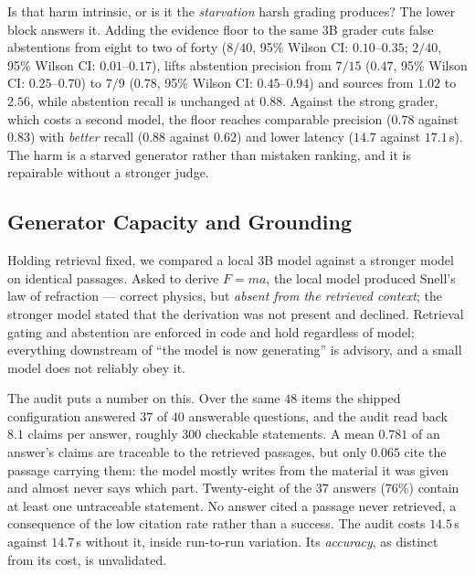 \documentclass[conference]{IEEEtran}
\begin{document}
Is that harm intrinsic, or is it the \emph{starvation} harsh grading produces?
The lower block answers it. Adding the evidence floor to the same $3$B grader
cuts false abstentions from eight to two of forty ($8/40$, 95\% Wilson CI:
$0.10$--$0.35$; $2/40$, 95\% Wilson CI: $0.01$--$0.17$), lifts abstention
precision from $7/15$ ($0.47$, 95\% Wilson CI: $0.25$--$0.70$) to $7/9$ ($0.78$,
95\% Wilson CI: $0.45$--$0.94$) and sources from $1.02$ to $2.56$, while
abstention recall is unchanged at $0.88$. Against the strong grader, which costs
a second model, the floor reaches comparable precision ($0.78$ against $0.83$)
with \emph{better} recall ($0.88$ against $0.62$) and lower latency ($14.7$
against $17.1$\,s). The harm is a starved generator rather than mistaken
ranking, and it is repairable without a stronger judge.

\subsection{Generator Capacity and Grounding}
\label{sec:faithfulness}
Holding retrieval fixed, we compared a local $3$B model against a stronger model
on identical passages. Asked to derive $F = ma$, the local model produced
Snell's law of refraction --- correct physics, but \emph{absent from the
retrieved context}; the stronger model stated that the derivation was not
present and declined. Retrieval gating and abstention are enforced in code and
hold regardless of model; everything downstream of ``the model is now
generating'' is advisory, and a small model does not reliably obey it.

The audit puts a number on this. Over the same $48$ items the shipped
configuration answered $37$ of $40$ answerable questions, and the audit read
back $8.1$ claims per answer, roughly $300$ checkable statements. A mean $0.781$
of an answer's claims are traceable to the retrieved passages, but only $0.065$
cite the passage carrying them: the model mostly writes from the material it was
given and almost never says which part. Twenty-eight of the $37$ answers
($76\%$) contain at least one untraceable statement. No answer cited a passage
never retrieved, a consequence of the low citation rate rather than a success.
The audit costs $14.5$\,s against $14.7$\,s without it, inside run-to-run
variation. Its \emph{accuracy}, as distinct from its cost, is unvalidated.
\end{document}

